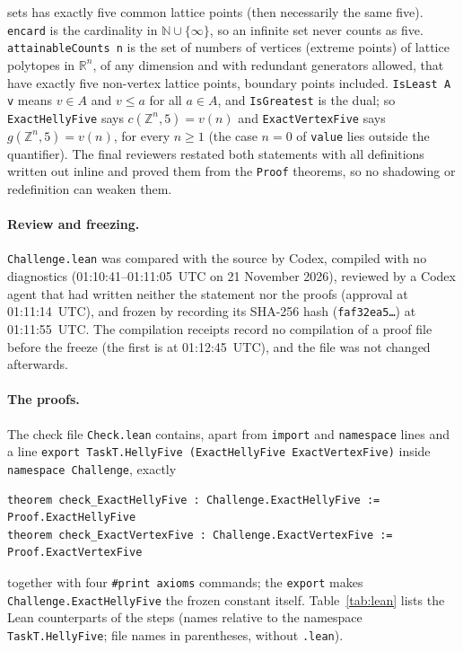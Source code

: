 \documentclass[11pt]{article}
\theoremstyle{definition}
\theoremstyle{remark}
\newcommand{\Z}{\mathbb Z}
\newcommand{\R}{\mathbb R}
\begin{document}
{sets has exactly five common lattice points (then necessarily the same five).
\texttt{encard} is the cardinality in $\mathbb N\cup\{\infty\}$, so an infinite
set never counts as five. \texttt{attainableCounts n} is the set of numbers of
vertices (extreme points) of lattice polytopes in $\R^n$, of any dimension and
with redundant generators allowed, that have exactly five non-vertex lattice
points, boundary points included. \texttt{IsLeast A v} means $v\in A$ and $v\le a$
for all $a\in A$, and \texttt{IsGreatest} is the dual; so
\texttt{ExactHellyFive} says $c(\Z^n,5)=v(n)$ and \texttt{ExactVertexFive} says
$g(\Z^n,5)=v(n)$, for every $n\ge1$ (the case $n=0$ of \texttt{value} lies
outside the quantifier). The final reviewers restated both statements with all
definitions written out inline and proved them from the \texttt{Proof}
theorems, so no shadowing or redefinition can weaken them.

\paragraph{Review and freezing.} \texttt{Challenge.lean} was compared with the
source by Codex, compiled with no diagnostics (01:10:41--01:11:05~UTC on
21 November 2026), reviewed by a Codex agent that had written neither the
statement nor the proofs (approval at 01:11:14~UTC), and frozen by recording
its SHA-256 hash (\texttt{faf32ea5\ldots}) at 01:11:55~UTC. The compilation
receipts record no compilation of a proof file before the freeze (the first
is at 01:12:45~UTC), and the file was not changed afterwards.

\paragraph{The proofs.} The check file \texttt{Check.lean} contains, apart
from \texttt{import} and \texttt{namespace} lines and a line
\texttt{export TaskT.HellyFive (ExactHellyFive ExactVertexFive)} inside
\texttt{namespace Challenge}, exactly
{\footnotesize
\begin{verbatim}
theorem check_ExactHellyFive : Challenge.ExactHellyFive := Proof.ExactHellyFive
theorem check_ExactVertexFive : Challenge.ExactVertexFive := Proof.ExactVertexFive
\end{verbatim}}
\noindent together with four \texttt{\#print axioms} commands; the
\texttt{export} makes \texttt{Challenge.ExactHellyFive} the frozen constant
itself. Table~\ref{tab:lean} lists the Lean counterparts of the steps (names
relative to the namespace \texttt{TaskT.HellyFive}; file names in parentheses,
without \texttt{.lean}).

}
\end{document}
